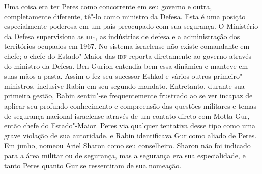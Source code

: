 
Uma coisa era ter Peres como concorrente em seu governo e outra,
completamente diferente, tê"-lo como ministro da Defesa. Esta é uma
posição especialmente poderosa em um país preocupado com sua segurança.
O Ministério da Defesa supervisiona as \textsc{idf}, as indústrias de defesa e a
administração dos territórios ocupados em 1967. No sistema israelense
não existe comandante em chefe; o chefe do Estado"-Maior das \textsc{idf} reporta
diretamente ao governo através do ministro da Defesa. Ben Gurion
entendia bem essa dinâmica e manteve em suas mãos a pasta.
Assim o fez seu sucessor Eshkol e vários outros primeiro"-ministros,
inclusive Rabin em seu segundo mandato. Entretanto, durante sua primeira gestão,
Rabin sentiu"-se frequentemente frustrado ao se ver incapaz de aplicar
seu profundo conhecimento e compreensão das questões militares e temas
de segurança nacional israelense através de um contato direto com Motta
Gur, então chefe do Estado"-Maior. Peres via qualquer tentativa desse
tipo como uma grave violação de sua autoridade, e Rabin identificava Gur
como aliado de Peres. Em junho, nomeou Ariel Sharon como seu
conselheiro. Sharon não foi indicado para a área militar ou de segurança,
mas a segurança era sua especialidade, e tanto Peres quanto Gur se
ressentiram de sua nomeação.

